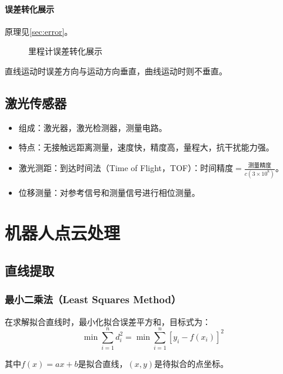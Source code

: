 \documentclass[
12pt, %
a4paper, 
oneside, %
headinclude,footinclude, %
]{scrartcl}
\begin{document}
\paragraph{误差转化展示}
原理见\ref{sec:error}。

\begin{figure}[H]
\centering
{} \quad
{}
\caption{里程计误差转化展示}
\end{figure}

直线运动时误差方向与运动方向垂直，曲线运动时则不垂直。
\subsection[激光传感器]{激光传感器}
\begin{itemize}
\item 组成：激光器，激光检测器，测量电路。
\item 特点：无接触远距离测量，速度快，精度高，量程大，抗干扰能力强。
\item 激光测距：到达时间法（Time of Flight，TOF）：$ \text{时间精度} = \frac{\text{测量精度}}{c(3 \times 10^8)} $。
\item 位移测量：对参考信号和测量信号进行相位测量。
\end{itemize}
\section{机器人点云处理}
\subsection[直线提取]{直线提取}
\subsubsection[最小二乘法]{最小二乘法（Least Squares Method）}
在求解拟合直线时，最小化拟合误差平方和，目标式为：
$$ \min \sum_{i = 1}^{n} d_i^2 = \min \sum_{i = 1}^{n}[y_i - f(x_i)]^2 $$

其中$ f(x) = ax + b $是拟合直线，$ (x, y) $是待拟合的点坐标。
\end{document}
